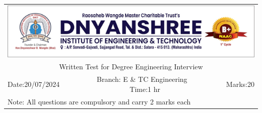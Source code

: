 \documentclass[a4, 11pt, addpoints]{exam}
\begin{document}
\def\arraystretch{1}
\begin{longtable}{lp{}p{}r}
\multicolumn{4}{c}{\includegraphics[width= \textwidth]{dietlogo}} \\ 
\multicolumn{4}{c}{Written Test for Degree Engineering Interview} \\
Date:20/07/2024 & \multicolumn{2}{c}{ ~~~Branch: E \& TC Engineering ~~~~ Time:1 hr} & Marks:20 \\
\multicolumn{4}{l}{ Note: All questions are compulsory and carry 2 marks each  } \\ \hline
\end{longtable}
\end{document}
